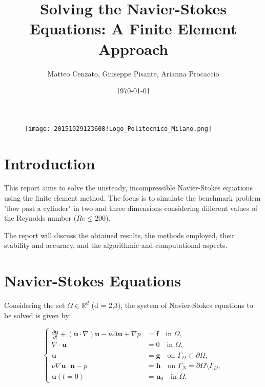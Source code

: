 \documentclass{article}
\title{Solving the Navier-Stokes Equations: A Finite Element Approach}
\author{ Matteo Cenzato, Giuseppe Pisante, Arianna Procaccio}
\date{\today}
\begin{document}
\maketitle

\begin{figure}[H]
    \centering
    \texttt{[image: 20151029123608!Logo\_Politecnico\_Milano.png]}
    \label{fig:enter-label}
\end{figure}



\newpage
\tableofcontents


\section*{Introduction}

This report aims to solve the unsteady, incompressible Navier-Stokes equations using the finite element method. The focus is to simulate the benchmark problem "flow past a cylinder" in two and three dimensions considering different values of the Reynolds number (\(Re \leq 200\)).



The report will discuss the obtained results, the methods employed, their stability and accuracy, and the algorithmic and computational aspects.

\section*{Navier-Stokes Equations}

Considering the set $\Omega \in \mathbb{R}^d$ (d = 2,3), the system of Navier-Stokes equations to be solved is given by:

\begin{equation}
\begin{cases}
\frac{\partial \mathbf{u}}{\partial t} + (\mathbf{u} \cdot \nabla)\mathbf{u} - \nu \Delta \mathbf{u} + \nabla p &= \mathbf{f} \quad \text{in } \Omega , \\
\nabla \cdot \mathbf{u} &= 0 \quad \text{in } \Omega, \\
\mathbf{u} &= \mathbf{g} \quad \text{on } \Gamma_D \subset \partial \Omega, \\
\nu \nabla \mathbf{u} \cdot \mathbf{n} - p &= \mathbf{h} \quad \text{on } \Gamma_N = \partial \Omega \setminus \Gamma_D, \\
\mathbf{u}(t = 0) &= \mathbf{u}_0 \quad \text{in } \Omega.
\end{cases}
\end{equation}
\end{document}
